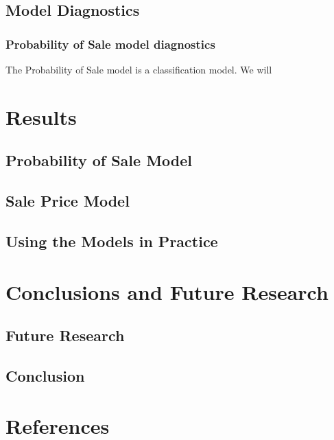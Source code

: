\documentclass[]{article}
\begin{document}
\subsection{Model Diagnostics}\label{model-diagnostics}

\subsubsection{Probability of Sale model
diagnostics}\label{probability-of-sale-model-diagnostics}

The Probability of Sale model is a classification model. We will

\section{Results}\label{results}

\subsection{Probability of Sale Model}\label{probability-of-sale-model}

\subsection{Sale Price Model}\label{sale-price-model}

\subsection{Using the Models in
Practice}\label{using-the-models-in-practice}

\section{Conclusions and Future
Research}\label{conclusions-and-future-research}

\subsection{Future Research}\label{future-research}

\subsection{Conclusion}\label{conclusion}

\section*{References}\label{references}
\end{document}
